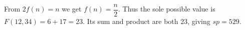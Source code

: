 From $2f(n)=n$ we get $f(n)=\dfrac{n}{2}$. Thus the sole possible value is $F(12,34)=6+17=23$. Its sum and product are both 23, giving $\boxed{sp=529}$.
